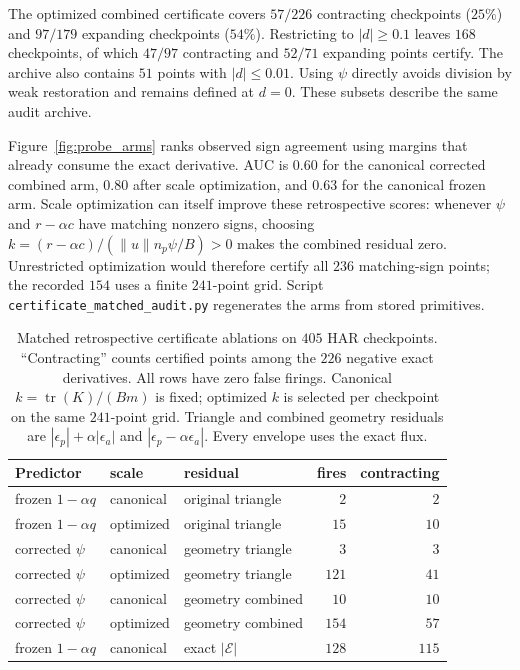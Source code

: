 \documentclass{article}
\begin{document}
The optimized combined certificate covers $57/226$ contracting checkpoints ($25\%$) and $97/179$ expanding checkpoints ($54\%$). Restricting to $|d|\ge0.1$ leaves $168$ checkpoints, of which $47/97$ contracting and $52/71$ expanding points certify. The archive also contains $51$ points with $|d|\le0.01$. Using $\psi$ directly avoids division by weak restoration and remains defined at $d=0$. These subsets describe the same audit archive.

Figure~\ref{fig:probe_arms} ranks observed sign agreement using margins that already consume the exact derivative. AUC is $0.60$ for the canonical corrected combined arm, $0.80$ after scale optimization, and $0.63$ for the canonical frozen arm. Scale optimization can itself improve these retrospective scores: whenever $\psi$ and $r-\alpha c$ have matching nonzero signs, choosing $k=(r-\alpha c)/(\|u\|n_p\psi/B)>0$ makes the combined residual zero. Unrestricted optimization would therefore certify all $236$ matching-sign points; the recorded $154$ uses a finite $241$-point grid. Script \texttt{certificate\_matched\_audit.py} regenerates the arms from stored primitives.

\begin{table}[h]
\centering
\caption{Matched retrospective certificate ablations on $405$ HAR checkpoints. ``Contracting'' counts certified points among the $226$ negative exact derivatives. All rows have zero false firings. Canonical $k=\operatorname{tr}(K)/(Bm)$ is fixed; optimized $k$ is selected per checkpoint on the same $241$-point grid. Triangle and combined geometry residuals are $|\epsilon_p|+\alpha|\epsilon_a|$ and $|\epsilon_p-\alpha\epsilon_a|$. Every envelope uses the exact flux.}
\label{tab:probe_arms}
\footnotesize
\begin{tabular}{lllrr}
\toprule
Predictor & scale & residual & fires & contracting \\
\midrule
frozen $1-\alpha q$ & canonical & original triangle & $2$ & $2$ \\
frozen $1-\alpha q$ & optimized & original triangle & $15$ & $10$ \\
corrected $\psi$ & canonical & geometry triangle & $3$ & $3$ \\
corrected $\psi$ & optimized & geometry triangle & $121$ & $41$ \\
corrected $\psi$ & canonical & geometry combined & $10$ & $10$ \\
corrected $\psi$ & optimized & geometry combined & $154$ & $57$ \\
frozen $1-\alpha q$ & canonical & exact $|\mathcal E|$ & $128$ & $115$ \\
\bottomrule
\end{tabular}
\end{table}
\end{document}
